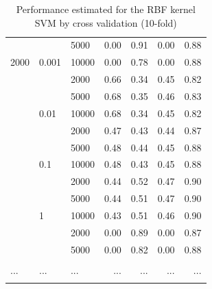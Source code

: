 \documentclass[a4paper,10pt]{article}
\begin{document}
\begin{table}[!ht]
\begin{multicols}{2}
\begin{scriptsize}
\begin{tabular}{|lllrrrr|}
      &       & 5000 &       0.00 &       0.91 &       0.00 &       0.88 \\
2000 & 0.001 & 10000 &       0.00 &       0.78 &       0.00 &       0.88 \\
      &       & 2000 &       0.66 &       0.34 &       0.45 &       0.82 \\
      &       & 5000 &       0.68 &       0.35 &       0.46 &       0.83 \\
      & 0.01 & 10000 &       0.68 &       0.34 &       0.45 &       0.82 \\
      &       & 2000 &       0.47 &       0.43 &       0.44 &       0.87 \\
      &       & 5000 &       0.48 &       0.44 &       0.45 &       0.88 \\
      & 0.1 & 10000 &       0.48 &       0.43 &       0.45 &       0.88 \\
      &       & 2000 &       0.44 &       0.52 &       0.47 &       0.90 \\
      &       & 5000 &       0.44 &       0.51 &       0.47 &       0.90 \\
      & 1 & 10000 &       0.43 &       0.51 &       0.46 &       0.90 \\
      &       & 2000 &       0.00 &       0.89 &       0.00 &       0.87 \\
      &       & 5000 &       0.00 &       0.82 &       0.00 &       0.88 \\
      & 	  &		 &            &            &            &            \\
 ...  &  ...  & ...  &   ...      &   ...      &   ...      &   ...      \\
      & 	  &		 &            &            &            &            \\
\bottomrule
\end{tabular}
\end{scriptsize}
\end{multicols}
\caption{Performance estimated for the RBF kernel SVM by cross validation (10-fold)}
\label{Cross_val: SVM}
\end{table}
\restoregeometry
\newpage

%
%

\end{document}
